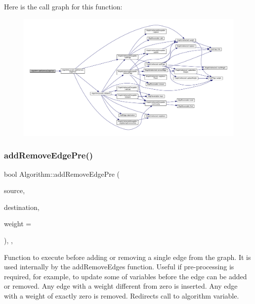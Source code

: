 Here is the call graph for this function\+:
\nopagebreak
\begin{figure}[H]
\begin{center}
\leavevmode
\includegraphics[width=350pt]{classAlgorithm_ad78e2c5819da723c373ce6d4a28ac36d_cgraph}
\end{center}
\end{figure}
\mbox{\label{classAlgorithm_a5835b23797b9d00f4090b996660af5d4}} 
\subsubsection{\texorpdfstring{add\+Remove\+Edge\+Pre()}{addRemoveEdgePre()}}
{\footnotesize\ttfamily bool Algorithm\+::add\+Remove\+Edge\+Pre (\begin{DoxyParamCaption}\item[{const \hyperlink{edge_8h_a5fbd20c46956d479cb10afc9855223f6}{type\+Vertex} \&}]{source,  }\item[{const \hyperlink{edge_8h_a5fbd20c46956d479cb10afc9855223f6}{type\+Vertex} \&}]{destination,  }\item[{const \hyperlink{edge_8h_a2e7ea3be891ac8b52f749ec73fee6dd2}{type\+Weight} \&}]{weight = {} }\end{DoxyParamCaption})\hspace{0.3cm}{\ttfamily [inline]}, {\ttfamily [private]}, {\ttfamily [virtual]}}

Function to execute before adding or removing a single edge from the graph. It is used internally by the add\+Remove\+Edges function. Useful if pre-\/processing is required, for example, to update some of variables before the edge can be added or removed. Any edge with a weight different from zero is inserted. Any edge with a weight of exactly zero is removed. Redirects call to algorithm variable.


